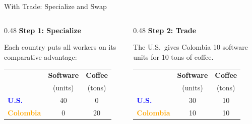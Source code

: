 \documentclass[9pt,english,aspectratio=169]{beamer}
\begin{document}
\begin{frame}{With Trade: Specialize and Swap}

  \begin{columns}[T]
    \begin{column}{0.48\textwidth}
      \textbf{Step 1: Specialize}

      \vspace{0.5em}
      Each country puts all workers on its comparative advantage:

      \vspace{0.8em}
      \centering
      \begin{tabular}{@{} l c c @{}}
        \toprule
        & \textbf{Software} & \textbf{Coffee} \\
        & (units) & (tons) \\
        \midrule
        \textcolor{blue}{\textbf{U.S.}} & 40 & 0 \\
        \textcolor{orange}{\textbf{Colombia}} & 0 & 20 \\
        \bottomrule
      \end{tabular}
    \end{column}
    \begin{column}{0.48\textwidth}
      \pause
      \textbf{Step 2: Trade}

      \vspace{0.5em}
      The U.S.\ gives Colombia 10 software units for 10 tons of coffee.

      \vspace{0.8em}
      \centering
      \begin{tabular}{@{} l c c @{}}
        \toprule
        & \textbf{Software} & \textbf{Coffee} \\
        & (units) & (tons) \\
        \midrule
        \textcolor{blue}{\textbf{U.S.}} & 30 & 10 \\
        \textcolor{orange}{\textbf{Colombia}} & 10 & 10 \\
        \bottomrule
      \end{tabular}
    \end{column}
  \end{columns}

\end{frame}
\end{document}
